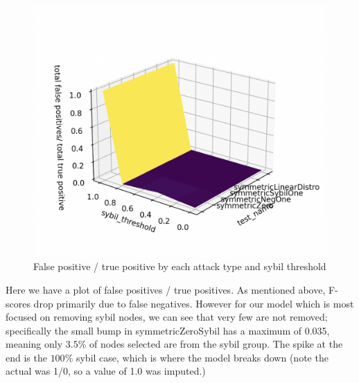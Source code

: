 \documentclass{article}
\begin{document}
\begin{figure}
\centering
\includegraphics[width=\textwidth, height=\textwidth]{false-pos-vs-true-pos}
\caption{False positive / true positive by each attack type and sybil threshold}
\end{figure}

Here we have a plot of false positives / true positives. As mentioned above, F-scores drop primarily due to false negatives. However for our model which is most focused on removing sybil nodes, we can see that very few are not removed; specifically the small bump in symmetricZeroSybil has a maximum of 0.035, meaning only $3.5\%$ of nodes selected are from the sybil group. The spike at the end is the $100\%$ sybil case, which is where the model breaks down (note the actual was 1/0, so a value of 1.0 was imputed.)
\end{document}
